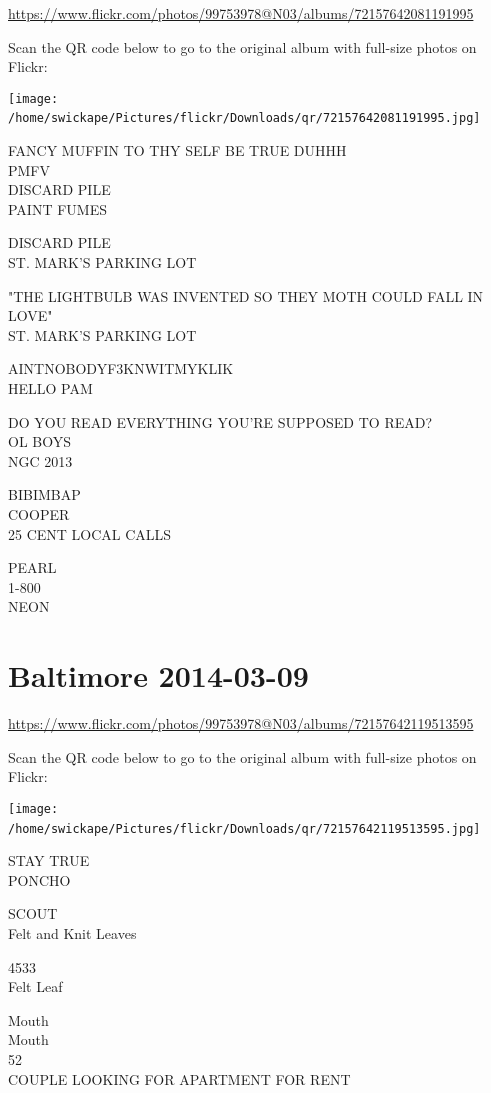 \documentclass[10pt,letterpaper]{article}
\begin{document}
\url{https://www.flickr.com/photos/99753978@N03/albums/72157642081191995}

Scan the QR code below to go to the original album with full-size photos on Flickr:

\texttt{[image: /home/swickape/Pictures/flickr/Downloads/qr/72157642081191995.jpg]}
\

FANCY MUFFIN TO THY SELF BE TRUE DUHHH\\
PMFV\\
DISCARD PILE\\
PAINT FUMES

DISCARD PILE\\
ST. MARK'S PARKING LOT

"THE LIGHTBULB WAS INVENTED SO THEY MOTH COULD FALL IN LOVE"\\
ST. MARK'S PARKING LOT

AINTNOBODYF3KNWITMYKLIK\\
HELLO PAM

DO YOU READ EVERYTHING YOU'RE SUPPOSED TO READ?\\
OL BOYS\\
NGC 2013

BIBIMBAP\\
COOPER\\
25 CENT LOCAL CALLS

PEARL\\
1{-}800\\
NEON
\

\section*{Baltimore 2014-03-09}

\url{https://www.flickr.com/photos/99753978@N03/albums/72157642119513595}

Scan the QR code below to go to the original album with full-size photos on Flickr:

\texttt{[image: /home/swickape/Pictures/flickr/Downloads/qr/72157642119513595.jpg]}
\

STAY TRUE\\
PONCHO

SCOUT\\
Felt and Knit Leaves

4533\\
Felt Leaf

Mouth\\
Mouth\\
52\\
COUPLE LOOKING FOR APARTMENT FOR RENT
\end{document}
